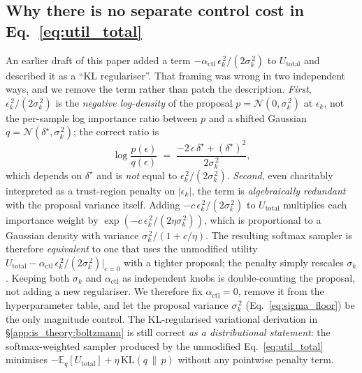 \documentclass{article}
\begin{document}
\subsection{Why there is no separate control cost in Eq.~\ref{eq:util_total}}
\label{app:is_theory:no_ctl}
An earlier draft of this paper added a term
$-\alpha_{\text{ctl}}\,\epsilon_k^{\,2}/(2\sigma_k^{\,2})$ to
$U_{\text{total}}$ and described it as a ``KL regulariser''. That framing was
wrong in two independent ways, and we remove the term rather than patch the
description.
\emph{First}, $\epsilon_k^{\,2}/(2\sigma_k^{\,2})$ is the \emph{negative
log-density} of the proposal $p=\mathcal{N}(0,\sigma_k^{\,2})$ at $\epsilon_k$,
not the per-sample log importance ratio between $p$ and a shifted Gaussian
$q=\mathcal{N}(\delta^{\star},\sigma_k^{\,2})$; the correct ratio is
\begin{equation}
  \log\frac{p(\epsilon)}{q(\epsilon)}
  \;=\; \frac{-2\,\epsilon\,\delta^{\star} + (\delta^{\star})^{2}}{2\sigma_k^{\,2}},
  \label{eq:correct_log_ratio}
\end{equation}
which depends on $\delta^{\star}$ and is \emph{not} equal to
$\epsilon_k^{\,2}/(2\sigma_k^{\,2})$.
\emph{Second}, even charitably interpreted as a trust-region penalty on
$|\epsilon_k|$, the term is \emph{algebraically redundant} with the proposal
variance itself. Adding $-c\,\epsilon_k^{\,2}/(2\sigma_k^{\,2})$ to
$U_{\text{total}}$ multiplies each importance weight by
$\exp(-c\,\epsilon_k^{\,2}/(2\eta\sigma_k^{\,2}))$, which is proportional to
a Gaussian density with variance $\sigma_k^{\,2}/(1+c/\eta)$. The resulting
softmax sampler is therefore \emph{equivalent} to one that uses the
unmodified utility $U_{\text{total}}-\alpha_{\text{ctl}}\,\epsilon_k^{\,2}/(2\sigma_k^{\,2})\big|_{c=0}$
with a tighter proposal; the penalty simply rescales $\sigma_k$. Keeping both
$\sigma_k$ and $\alpha_{\text{ctl}}$ as independent knobs is double-counting
the proposal, not adding a new regulariser.
We therefore fix $\alpha_{\text{ctl}}=0$, remove it from the hyperparameter
table, and let the proposal variance $\sigma_k^{\,2}$ (Eq.~\ref{eq:sigma_floor})
be the only magnitude control. The KL-regularised variational derivation in
\S\ref{app:is_theory:boltzmann} is still correct \emph{as a distributional
statement}: the softmax-weighted sampler produced by the unmodified
Eq.~\ref{eq:util_total} minimises $-\mathbb{E}_q[U_{\text{total}}]+\eta\,\mathrm{KL}(q\,\|\,p)$
without any pointwise penalty term.
\end{document}
